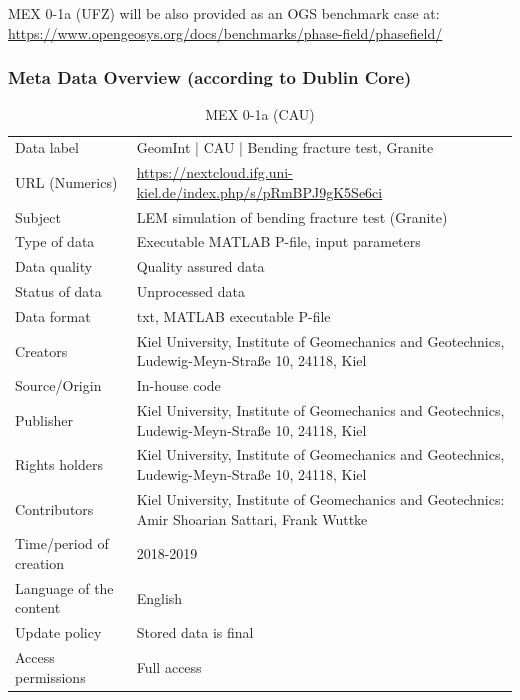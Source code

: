 MEX 0-1a (UFZ) will be also provided as an OGS benchmark case at:\\
\small
\url{https://www.opengeosys.org/docs/benchmarks/phase-field/phasefield/}
\normalsize

\clearpage
\subsubsection*{Meta Data Overview (according to Dublin Core)}
\begin{table}[!ht]
\caption{MEX 0-1a (CAU)}
\label{tab:dms-mex0-1a-cau}
\small
\begin{tabular}{R{3.5cm}|L{7.5cm}}
\hline
%
Data label & GeomInt | CAU | Bending fracture test, Granite \\
URL (Numerics) &  \url{https://nextcloud.ifg.uni-kiel.de/index.php/s/pRmBPJ9gK5Se6ci} \\
Subject  &  LEM simulation of bending fracture test (Granite)\\
Type of data  &  Executable MATLAB P-file, input parameters\\
Data quality  &  Quality assured data \\
Status of data  &  Unprocessed data\\
Data format  & txt, MATLAB executable P-file\\
Creators  &  Kiel University, Institute of Geomechanics and Geotechnics, Ludewig-Meyn-Stra\ss e 10, 24118, Kiel\\
Source/Origin & In-house code \\
Publisher  &  Kiel University, Institute of Geomechanics and Geotechnics, Ludewig-Meyn-Stra\ss e 10, 24118, Kiel \\
Rights holders &  Kiel University, Institute of Geomechanics and Geotechnics, Ludewig-Meyn-Stra\ss e 10, 24118, Kiel \\
Contributors &   Kiel University, Institute of Geomechanics and Geotechnics: Amir Shoarian Sattari, Frank Wuttke\\
Time/period of creation &  2018-2019\\
Language of the content &  English\\
Update policy &  Stored data is final\\
Access permissions & Full access\\
%
\hline
\end{tabular}
\end{table}

